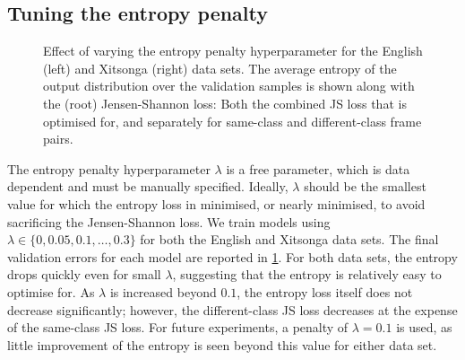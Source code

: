 \subsection{Tuning the entropy penalty}
\begin{figure}
  \centering

\caption{\label{fig:entropy-penalty} Effect of varying the entropy penalty hyperparameter for the English (left) and Xitsonga (right) data sets.
The average entropy of the output distribution over the validation samples is shown along with the (root) Jensen-Shannon loss: Both the combined JS loss that is optimised for, and separately for same-class and different-class frame pairs.}
\end{figure}

The entropy penalty hyperparameter $\lambda$ is a free parameter, which is data dependent and must be manually specified.
Ideally, $\lambda$ should be the smallest value for which the entropy loss in minimised, or nearly minimised, to avoid sacrificing the Jensen-Shannon loss.
We train models using $\lambda \in \{0, 0.05, 0.1, \dots, 0.3\}$ for both the English and Xitsonga data sets.
The final validation errors for each model are reported in \cref{fig:entropy-penalty}.
For both data sets, the entropy drops quickly even for small $\lambda$, suggesting that the entropy is relatively easy to optimise for.
As $\lambda$ is increased beyond $0.1$, the entropy loss itself does not decrease significantly; however, the different-class JS loss decreases at the expense of the same-class JS loss.
For future experiments, a penalty of $\lambda = 0.1$ is used, as little improvement of the entropy is seen beyond this value for either data set.

